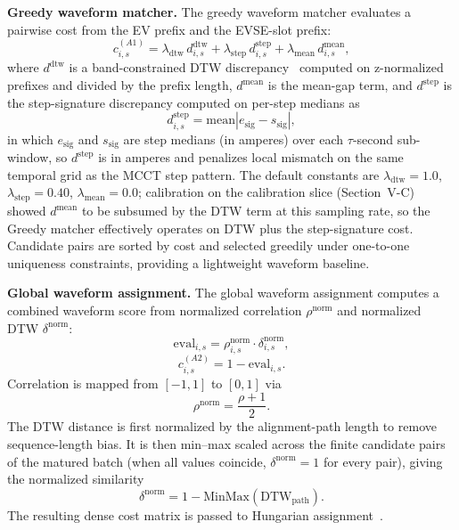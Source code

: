 \documentclass{ieeeaccess}
\begin{document}
    \textbf{Greedy waveform matcher.}
    The greedy waveform matcher evaluates a pairwise cost from the EV prefix and the EVSE-slot prefix:
    \begin{equation}\label{eq:e6}
        c^{(A1)}_{i,s} = \lambda_{\text{dtw}}\,d^{\text{dtw}}_{i,s} + \lambda_{\text{step}}\,d^{\text{step}}_{i,s} + \lambda_{\text{mean}}\,d^{\text{mean}}_{i,s},
    \end{equation}
    where $d^{\text{dtw}}$ is a band-constrained DTW discrepancy~\cite{b16} computed on z-normalized prefixes and divided by the prefix length, $d^{\text{mean}}$ is the mean-gap term, and $d^{\text{step}}$ is the step-signature discrepancy computed on per-step medians as
    \begin{equation}\label{eq:e7}
        d^{\text{step}}_{i,s} = \text{mean}|e_{\text{sig}} - s_{\text{sig}}|,
    \end{equation}
    in which $e_{\text{sig}}$ and $s_{\text{sig}}$ are step medians (in amperes) over each $\tau$-second sub-window, so $d^{\text{step}}$ is in amperes and penalizes local mismatch on the same temporal grid as the MCCT step pattern.
    The default constants are $\lambda_{\text{dtw}} = 1.0$, $\lambda_{\text{step}} = 0.40$, $\lambda_{\text{mean}} = 0.0$; calibration on the calibration slice (Section~V-C) showed $d^{\text{mean}}$ to be subsumed by the DTW term at this sampling rate, so the Greedy matcher effectively operates on DTW plus the step-signature cost.
    Candidate pairs are sorted by cost and selected greedily under one-to-one uniqueness constraints, providing a lightweight waveform baseline.

    \textbf{Global waveform assignment.}
    The global waveform assignment computes a combined waveform score from normalized correlation $\rho^{\text{norm}}$ and normalized DTW $\delta^{\text{norm}}$:
    \begin{equation}\label{eq:e8}
        \text{eval}_{i,s} = \rho^{\text{norm}}_{i,s} \cdot \delta^{\text{norm}}_{i,s},
    \end{equation}
    \begin{equation}\label{eq:e9}
        c^{(A2)}_{i,s} = 1 - \text{eval}_{i,s}.
    \end{equation}
    Correlation is mapped from $[-1, 1]$ to $[0, 1]$ via
    \begin{equation}\label{eq:rhonorm}
        \rho^{\text{norm}} = \frac{\rho + 1}{2}.
    \end{equation}
    The DTW distance is first normalized by the alignment-path length to remove sequence-length bias.
    It is then min--max scaled across the finite candidate pairs of the matured batch (when all values coincide, $\delta^{\text{norm}} = 1$ for every pair), giving the normalized similarity
    \begin{equation}\label{eq:deltanorm}
        \delta^{\text{norm}} = 1 - \text{MinMax}(\text{DTW}_{\text{path}}).
    \end{equation}
    The resulting dense cost matrix is passed to Hungarian assignment~\cite{b15}.
\end{document}

